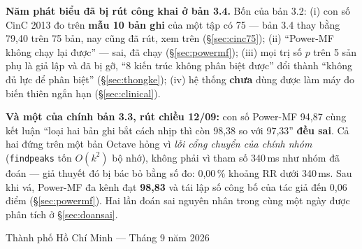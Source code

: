 \documentclass[12pt,a4paper]{article}
\begin{document}
\begin{titlepage}
\begin{ghichu}[title={Điểm khác biệt của bản đề cương này}]
\smallskip
\textbf{Năm phát biểu đã bị rút công khai ở bản 3.4.} Bốn của bản 3.2: (i) con số CinC 2013 đo trên \textbf{mẫu 10
bản ghi} của một tập có 75 --- bản 3.4 thay bằng 79,40 trên 75 bản, nay cũng đã rút, xem trên (\S\ref{sec:cinc75}); (ii) ``Power-MF
không chạy lại được'' --- sai, đã chạy (\S\ref{sec:powermf}); (iii) mọi trị số $p$ trên 5 sản phụ là giả
lập và đã bị gỡ, ``8 kiến trúc không phân biệt được'' đổi thành ``không đủ lực để phân biệt''
(\S\ref{sec:thongke}); (iv) hệ thống \textbf{chưa} dùng được làm máy đo biến thiên ngắn hạn
(\S\ref{sec:clinical}).

\smallskip
\textbf{Và một của chính bản 3.3, rút chiều 12/09:} con số Power-MF 94,87 cùng kết luận ``loại hai bản
ghi bắt cách nhịp thì còn 98,38 so với 97,33'' \textbf{đều sai}. Cả hai đứng trên một bản Octave hỏng vì
\textit{lỗi cổng chuyển của chính nhóm} (\texttt{findpeaks} tốn $O(k^2)$ bộ nhớ), không phải vì tham số
340\,ms như nhóm đã đoán --- giả thuyết đó bị bác bỏ bằng số đo: 0,00\,\% khoảng RR dưới 340\,ms. Sau khi
vá, Power-MF đa kênh đạt \textbf{98,83} và tái lập số công bố của tác giả đến 0,06 điểm
(\S\ref{sec:powermf}). Hai lần đoán sai nguyên nhân trong cùng một ngày được phân tích ở
\S\ref{sec:doansai}.
\end{ghichu}

\vspace{0.5cm}
{\small Thành phố Hồ Chí Minh --- Tháng 9 năm 2026}
\end{titlepage}

\tableofcontents
\clearpage
\listoftables
\listoffigures
\clearpage
{}




\clearpage

\clearpage

\clearpage

\clearpage

\end{document}
